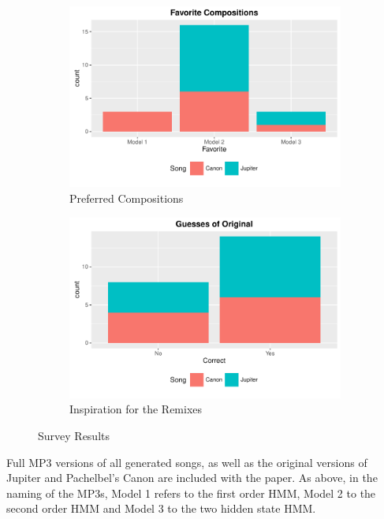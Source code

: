 \documentclass{article} %
\begin{document}
\begin{figure}[ht]
\centering
\begin{subfigure}{.5\textwidth}
  \centering
  \includegraphics[scale = 0.5]{SurveyFav.pdf}
  \caption{Preferred Compositions\label{survey1}}
  \label{fig:sub1}
\end{subfigure}%
\begin{subfigure}{.5\textwidth}
  \centering
  \includegraphics[scale = 0.5]{SurveyGuesses.pdf}
  \caption{Inspiration for the Remixes\label{survey2}}
  \label{fig:sub2}
\end{subfigure}
\caption{Survey Results}
\label{fig:test}
\end{figure}

Full MP3 versions of all generated songs, as well as the original versions of Jupiter and Pachelbel's Canon are included with the paper.  As above, in the naming of the MP3s, Model 1 refers to the first order HMM, Model 2 to the second order HMM and Model 3 to the two hidden state HMM.
\end{document}
